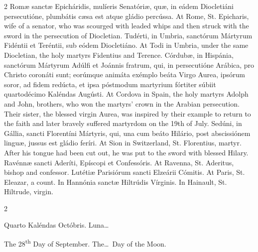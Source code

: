 \begin{paracol}{2}
Romæ sanctæ Epicháridis, 
 mulíeris Senatóriæ, quæ, in eádem Diocletiáni persecutióne, plumbátis cæsa 
 est atque gládio percússa.
\switchcolumn
{}
At Rome, St. Epicharis, wife of a 
 senator, who was scourged with leaded whips and then struck with the sword 
 in the persecution of Diocletian.
\switchcolumn*
{}
Tudérti, in Umbria, 
 sanctórum Mártyrum Fidéntii et Teréntii, sub eódem Diocletiáno.
\switchcolumn
{}
At Todi in Umbria, under the same 
 Diocletian, the holy martyrs Fidentius and Terence.
\switchcolumn*
{}
Córdubæ, in Hispánia, 
 sanctórum Mártyrum Adúlfi et Joánnis fratrum, qui, in persecutióne Arábica, 
 pro Christo coronáti sunt; eorúmque animáta exémplo beáta Virgo Aurea, 
 ipsórum soror, ad fidem redúcta, et ipsa póstmodum martyrium fórtiter súbiit 
 quartodécimo Kaléndas Augústi.
\switchcolumn
{}
At Cordova in Spain, the holy 
 martyrs Adolph and John, brothers, who won the martyrs' crown in the 
 Arabian persecution. Their sister, the blessed virgin Aurea, was 
 inspired by their example to return to the faith and later bravely suffered 
 martyrdom on the 19th of July.
\switchcolumn*
{}
Sedúni, in Gállia, 
 sancti Florentíni Mártyris, qui, una cum beáto Hilário, post abscissiónem 
 linguæ, jussus est gládio feríri.
\switchcolumn
{}
At Sion in Switzerland, St. 
 Florentius, martyr. After his tongue had been cut out, he was put to 
 the sword with blessed Hilary.
\switchcolumn*
{}
Ravénnæ sancti Aderíti, 
 Epíscopi et Confessóris.
\switchcolumn
{}
At Ravenna, St. Aderitus, bishop and 
 confessor.
\switchcolumn*
{}
Lutétiæ Parisiórum 
 sancti Elzeárii Cómitis.
\switchcolumn
{}
At Paris, St. Eleazar, a count.
\switchcolumn*
{}
In Hannónia sanctæ 
 Hiltrúdis Vírginis.
\switchcolumn
{}
In Hainault, St. Hiltrude, virgin.
\switchcolumn*
{}
\end{paracol}


\begin{paracol}{2}
\begin{center}{\color{gregoriocolor} Quarto Kaléndas Octóbris. 
 Luna\dots\ }\end{center}
\switchcolumn
{}
\begin{center}{\color{gregoriocolor} The   28\textsuperscript{th} Day of 
 September. The\dots\ Day of the Moon.}\end{center}
\end{paracol}

